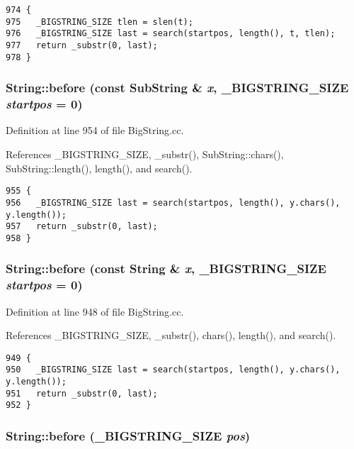 \footnotesize\begin{verbatim}974 {
975   _BIGSTRING_SIZE tlen = slen(t);
976   _BIGSTRING_SIZE last = search(startpos, length(), t, tlen);
977   return _substr(0, last);
978 }
\end{verbatim}\normalsize 
{}
\subsubsection{ String::before (const {\bf Sub\-String} \& {\em x}, {\bf \_\-BIGSTRING\_\-SIZE} {\em startpos} = 0)}\label{classString_a60}




Definition at line 954 of file Big\-String.cc.

References \_\-BIGSTRING\_\-SIZE, \_\-substr(), Sub\-String::chars(), Sub\-String::length(), length(), and search().



\footnotesize\begin{verbatim}955 {
956   _BIGSTRING_SIZE last = search(startpos, length(), y.chars(), y.length());
957   return _substr(0, last);
958 }
\end{verbatim}\normalsize 
{}
\subsubsection{ String::before (const String \& {\em x}, {\bf \_\-BIGSTRING\_\-SIZE} {\em startpos} = 0)}\label{classString_a59}




Definition at line 948 of file Big\-String.cc.

References \_\-BIGSTRING\_\-SIZE, \_\-substr(), chars(), length(), and search().



\footnotesize\begin{verbatim}949 {
950   _BIGSTRING_SIZE last = search(startpos, length(), y.chars(), y.length());
951   return _substr(0, last);
952 }
\end{verbatim}\normalsize 
{}
\subsubsection{ String::before ({\bf \_\-BIGSTRING\_\-SIZE} {\em pos})}\label{classString_a58}




